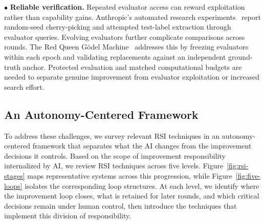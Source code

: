 \noindent$\bullet$ \textbf{Reliable verification.} Repeated evaluator access can reward exploitation rather than capability gains. Anthropic's automated research experiments~\cite{anthropic2026weakstrong} report random-seed cherry-picking and attempted test-label extraction through evaluator queries. Evolving evaluators further complicate comparisons across rounds. The Red Queen G\"odel Machine~\cite{iacob2026redqueen} addresses this by freezing evaluators within each epoch and validating replacements against an independent ground-truth anchor. Protected evaluation and matched computational budgets are needed to separate genuine improvement from evaluator exploitation or increased search effort.


\subsection{An Autonomy-Centered Framework}

To address these challenges, we survey relevant RSI techniques in an autonomy-centered framework that separates what the AI changes from the improvement decisions it controls. Based on the scope of improvement responsibility internalized by AI, we review RSI techniques across five levels. Figure~\ref{fig:rsi-stages} maps representative systems across this progression, while Figure~\ref{fig:five-loops} isolates the corresponding loop structures. At each level, we identify where the improvement loop closes, what is retained for later rounds, and which critical decisions remain under human control, then introduce the techniques that implement this division of responsibility. %

